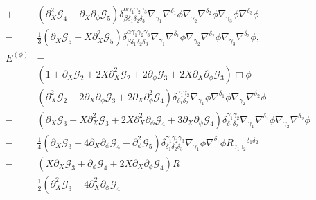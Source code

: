 \documentclass{ws-ijmpd}
\begin{document}
\begin{align}
   \nonumber\\
   +&
   \left(
      \partial_X^2\mathcal{G}_4
      -
      \partial_X\partial_{\phi}\mathcal{G}_5
   \right)
   \delta^{\alpha\gamma_1\gamma_2\gamma_3}_{\beta\delta_1\delta_2\delta_3}
   \nabla_{\gamma_1}\nabla^{\delta_1}\phi
   \nabla_{\gamma_2}\nabla^{\delta_2}\phi
   \nabla_{\gamma_3}\phi\nabla^{\delta_3}\phi
   \nonumber\\
   -&
   \frac{1}{3}
   \left(
      \partial_X\mathcal{G}_5
      +
      X\partial_X^2\mathcal{G}_5
   \right)
   \delta^{\alpha\gamma_1\gamma_2\gamma_3}_{\beta\delta_1\delta_2\delta_3}
   \nabla_{\gamma_1}\nabla^{\delta_1}\phi
   \nabla_{\gamma_2}\nabla^{\delta_2}\phi
   \nabla_{\gamma_3}\nabla^{\delta_3}\phi
   ,\\
\label{eq:scalar_eom_horndeski}
   E^{(\phi)}
   &=
   \nonumber\\
   -&
   \left(
      1
      +
      \partial_X\mathcal{G}_2
      +
      2X\partial_X^2\mathcal{G}_2
      +
      2\partial_{\phi}\mathcal{G}_3
      +
      2X\partial_X\partial_{\phi}\mathcal{G}_3
   \right)\Box\phi
   \nonumber\\
   -&
   \left(
      \partial_X^2\mathcal{G}_2
      +
      2\partial_X\partial_{\phi}\mathcal{G}_3
      +
      2\partial_X\partial_{\phi}^2\mathcal{G}_4
   \right)
   \delta^{\gamma_1\gamma_2}_{\delta_1\delta_2}
   \nabla_{\gamma_1}\phi\nabla^{\delta_1}\phi
   \nabla_{\gamma_2}\nabla^{\delta_2}\phi
   \nonumber\\
   -&
   \left(
      \partial_X\mathcal{G}_3
      +
      X\partial_X^2\mathcal{G}_3
      +
      2X\partial_X^2\partial_{\phi}\mathcal{G}_4
      +
      3\partial_X\partial_{\phi}\mathcal{G}_4
   \right)
   \delta^{\gamma_1\gamma_2}_{\delta_1\delta_2}
   \nabla_{\gamma_1}\nabla^{\delta_1}\phi
   \nabla_{\gamma_2}\nabla^{\delta_2}\phi
   \nonumber\\
   -&
   \frac{1}{4}\left(
      \partial_X\mathcal{G}_3
      +
      4\partial_X\partial_{\phi}\mathcal{G}_4
      -
      \partial_{\phi}^2\mathcal{G}_5
   \right)
   \delta^{\gamma_1\gamma_2\gamma_3}_{\delta_1\delta_2\delta_3}
   \nabla_{\gamma_1}\phi\nabla^{\delta_1}\phi
   R_{\gamma_1\gamma_2}{}^{\delta_1\delta_2}
   \nonumber\\
   -&
   \left(
      X\partial_X\mathcal{G}_3
      +
      \partial_{\phi}\mathcal{G}_4
      +
      2X\partial_X\partial_{\phi}\mathcal{G}_4
   \right)R
   \nonumber\\
   -&
   \frac{1}{2}\left(
      \partial_X^2\mathcal{G}_3
      +
      4\partial_X^2\partial_{\phi}\mathcal{G}_4

\end{align}
\end{document}
